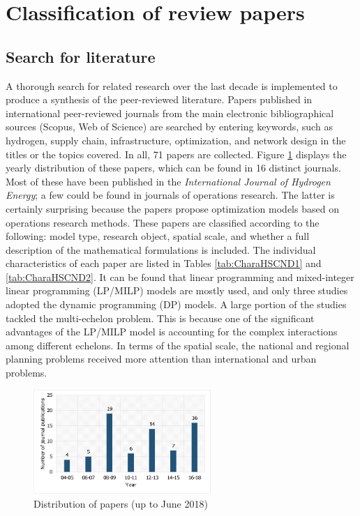 \documentclass[11pt,3p]{elsarticle}
\begin{document}
\section{Classification of review papers}
\label{sec:review}

\subsection{Search for literature}
\label{sec:searchliter}

A thorough search for related research over the last decade is implemented to produce a synthesis of the peer-reviewed literature. Papers published in international peer-reviewed journals from the main electronic bibliographical sources (Scopus, Web of Science) are searched by entering keywords, such as hydrogen, supply chain, infrastructure, optimization, and network design in the titles or the topics covered. In all, 71 papers are collected. Figure \ref{fig:DistributionPapers} displays the yearly distribution of these papers, which can be found in 16 distinct journals. Most of these have been published in the \textit{International Journal of Hydrogen Energy}; a few could be found in journals of operations research. The latter is certainly surprising because the papers propose optimization models based on operations research methods. These papers are classified according to the following: model type, research object, spatial scale, and whether a full description of the mathematical formulations is included. The individual characteristics of each paper are listed in Tables \ref{tab:CharaHSCND1} and \ref{tab:CharaHSCND2}. It can be found that linear programming and mixed-integer linear programming (LP/MILP) models are mostly used, and only three studies adopted the dynamic programming (DP) models. A large portion of the studies tackled the multi-echelon problem. This is because one of the significant advantages of the LP/MILP model is accounting for the complex interactions among different echelons. In terms of the spatial scale, the national and regional planning problems received more attention than international and urban problems. 

\begin{figure}[!htbp]
\centering\includegraphics[width=0.6\textwidth]{FIG_2}
\caption{\label{fig:DistributionPapers}Distribution of papers (up to June 2018)}
\end{figure}
\end{document}
